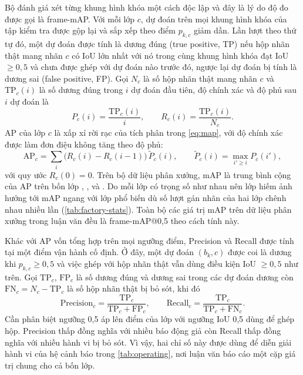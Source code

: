 Bộ đánh giá  xét từng khung hình khóa một cách độc lập và đây là lý do độ đo được gọi là frame-mAP. Với mỗi lớp $c$, dự đoán trên mọi khung hình khóa của tập kiểm tra được gộp lại và sắp xếp theo điểm $p_{k,c}$ giảm dần. Lần lượt theo thứ tự đó, một dự đoán được tính là dương đúng (true positive, TP) nếu hộp nhãn thật mang nhãn $c$ có IoU lớn nhất với nó trong cùng khung hình khóa đạt IoU $\geq 0{,}5$ và chưa được ghép với dự đoán nào trước đó, ngược lại dự đoán bị tính là dương sai (false positive, FP). Gọi $N_c$ là số hộp nhãn thật mang nhãn $c$ và $\mathrm{TP}_c(i)$ là số dương đúng trong $i$ dự đoán đầu tiên, độ chính xác và độ phủ sau $i$ dự đoán là
\begin{equation}
P_c(i) = \frac{\mathrm{TP}_c(i)}{i}, \qquad R_c(i) = \frac{\mathrm{TP}_c(i)}{N_c}.
\label{eq:pr-curve}
\end{equation}
AP của lớp $c$ là xấp xỉ rời rạc của tích phân trong \cref{eq:map}, với độ chính xác được làm đơn điệu không tăng theo độ phủ:
\begin{equation}
\mathrm{AP}_c = \sum_{i} \bigl(R_c(i) - R_c(i-1)\bigr)\,\tilde P_c(i), \qquad \tilde P_c(i) = \max_{i' \geq i} P_c(i'),
\label{eq:ap-discrete}
\end{equation}
với quy ước $R_c(0) = 0$. Trên bộ dữ liệu phân xưởng, mAP là trung bình cộng của AP trên bốn lớp , ,  và . Do mỗi lớp có trọng số như nhau nên lớp hiếm  ảnh hưởng tới mAP ngang với lớp phổ biến  dù số lượt gán nhãn của hai lớp chênh nhau nhiều lần (\cref{tab:factory-stats}). Toàn bộ các giá trị mAP trên dữ liệu phân xưởng trong luận văn đều là frame-mAP@0,5 theo cách tính này.

Khác với AP vốn tổng hợp trên mọi ngưỡng điểm, Precision và Recall được tính tại một điểm vận hành cố định. Ở đây, một dự đoán $(b_k, c)$ được coi là dương khi $p_{k,c} \geq 0{,}5$ và việc ghép với hộp nhãn thật vẫn dùng điều kiện IoU $\geq 0{,}5$ như trên. Gọi $\mathrm{TP}_c$, $\mathrm{FP}_c$ là số dương đúng và dương sai trong các dự đoán dương còn $\mathrm{FN}_c = N_c - \mathrm{TP}_c$ là số hộp nhãn thật bị bỏ sót, khi đó
\begin{equation}
\mathrm{Precision}_c = \frac{\mathrm{TP}_c}{\mathrm{TP}_c + \mathrm{FP}_c}, \qquad
\mathrm{Recall}_c = \frac{\mathrm{TP}_c}{\mathrm{TP}_c + \mathrm{FN}_c}.
\label{eq:prec-rec}
\end{equation}
Cần phân biệt ngưỡng 0,5 áp lên điểm của lớp với ngưỡng IoU 0,5 dùng để ghép hộp. Precision thấp đồng nghĩa với nhiều báo động giả còn Recall thấp đồng nghĩa với nhiều hành vi bị bỏ sót. Vì vậy, hai chỉ số này được dùng để diễn giải hành vi của hệ cảnh báo trong \cref{tab:operating}, nơi luận văn báo cáo một cặp giá trị chung cho cả bốn lớp.

